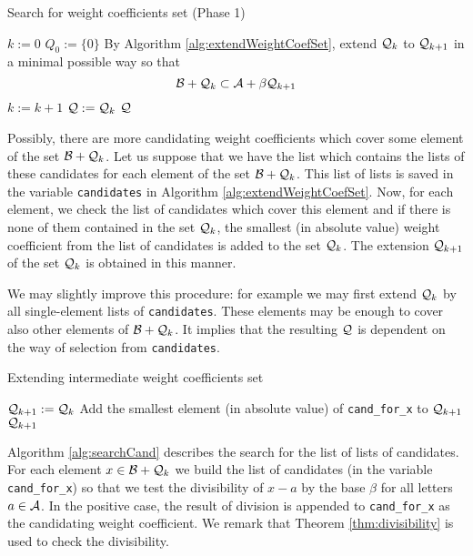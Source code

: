 \begin{algorithm}
  \caption{Search for weight coefficients set (Phase 1)}
    \label{alg:weightCoefSet}
  \begin{algorithmic}[1]
    \STATE $k:=0$ 
    \STATE $Q_0:=\{0\}$
    \REPEAT
     \STATE  By Algorithm \ref{alg:extendWeightCoefSet}, extend $\mathcal{Q}_k$ to $\mathcal{Q}_{k+1}$ in a minimal possible way so that $$\mathcal{B}+ \mathcal{Q}_k \subset \mathcal{A} + \beta \mathcal{Q}_{k+1}$$
     \vspace{-20pt}
      \STATE  $k:=k+1$
      \STATE $\mathcal{Q}:=\mathcal{Q}_k$
    \RETURN $\mathcal{Q}$
  \end{algorithmic}
\end{algorithm}

Possibly, there are more candidating weight coefficients which cover some element of the set $\mathcal{B}+ \mathcal{Q}_k$. Let us suppose that we have the list which contains the lists of these candidates for each element of the set $\mathcal{B}+ \mathcal{Q}_k$. This list of lists is saved in the variable \verb+candidates+ in Algorithm \ref{alg:extendWeightCoefSet}. Now, for each element, we check the list of candidates which cover this element and if there is none of them contained in the set $\mathcal{Q}_k$, the smallest (in absolute value) weight coefficient from the list of candidates is added to the set $\mathcal{Q}_k$. The extension $\mathcal{Q}_{k+1}$ of the set $\mathcal{Q}_k$ is obtained in this manner.   

We may slightly improve this procedure: for example we may first extend $\mathcal{Q}_{k}$ by all single-element lists of \verb+candidates+. These elements may be enough to cover also other elements of $\mathcal{B}+\mathcal{Q}_{k}$. It implies that the resulting $\mathcal{Q}$ is dependent on the way of selection from \verb+candidates+.

\begin{algorithm}
  \caption{Extending intermediate weight coefficients set}
    \label{alg:extendWeightCoefSet}
  \begin{algorithmic}[1]
    \STATE $\mathcal{Q}_{k+1}:=\mathcal{Q}_{k}$
            \STATE Add the smallest element (in absolute value) of  \verb+cand_for_x+ to $\mathcal{Q}_{k+1}$  
        \ENDIF
    \ENDFOR
    \RETURN $\mathcal{Q}_{k+1}$
  \end{algorithmic}
\end{algorithm}

Algorithm \ref{alg:searchCand} describes the search for the list of lists of candidates. For each element $x\in \mathcal{B} + \mathcal{Q}_{k}$ we build the list of candidates (in the variable \verb+cand_for_x+) so that we test the divisibility of $x-a$ by the base $\beta$ for all letters $a\in\mathcal{A}$. In the positive case, the result of division is appended to \verb+cand_for_x+ as the candidating weight coefficient. We remark that Theorem \ref{thm:divisibility} is used to check the divisibility.


